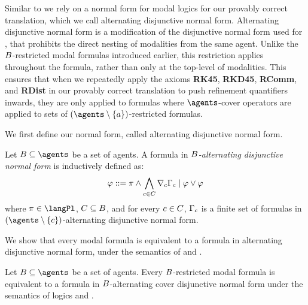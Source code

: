 Similar to \axiomRmlK{} we rely on a normal form for modal logics for our provably correct translation, which we call alternating disjunctive normal form.
Alternating disjunctive normal form is a modification of the disjunctive normal form used for \axiomRmlK{}, that prohibits the direct nesting of modalities from the same agent.
Unlike the $B$-restricted modal formulas introduced earlier, this restriction applies throughout the formula, rather than only at the top-level of modalities.
This ensures that when we repeatedly apply the axioms {\bf RK45}, {\bf RKD45}, {\bf RComm}, and {\bf RDist} in our provably correct translation to push refinement quantifiers inwards, they are only applied to formulas where $\agents$-cover operators are applied to sets of $(\agents \setminus \{\agentA\})$-restricted formulas.

We first define our normal form, called alternating disjunctive normal form.

\begin{definition}
Let $\agentsB \subseteq \agents$ be a set of agents.
A formula in {\em $B$-alternating disjunctive normal form} is inductively defined as:
$$
\varphi ::= \pi \land \bigwedge_{c \in C} \nabla_{c} \Gamma_c \mid \varphi \lor \varphi
$$
where $\pi \in \langPl$, $C \subseteq B$, and for every $c \in C$, $\Gamma_c$ is a finite set of formulas in $(\agents \setminus \{\agentC\})$-alternating disjunctive normal form.
\end{definition}

We show that every modal formula is equivalent to a formula in alternating disjunctive normal form, under the semantics of \logicKFF{} and \logicKD{}. 

\begin{lemma}\label{adnf-equivalent}
Let $\agentsB \subseteq \agents$ be a set of agents.
Every $B$-restricted modal formula is equivalent to a formula in $B$-alternating cover disjunctive normal form under the semantics of logics \logicKFF{} and \logicKD{}.
\end{lemma}


